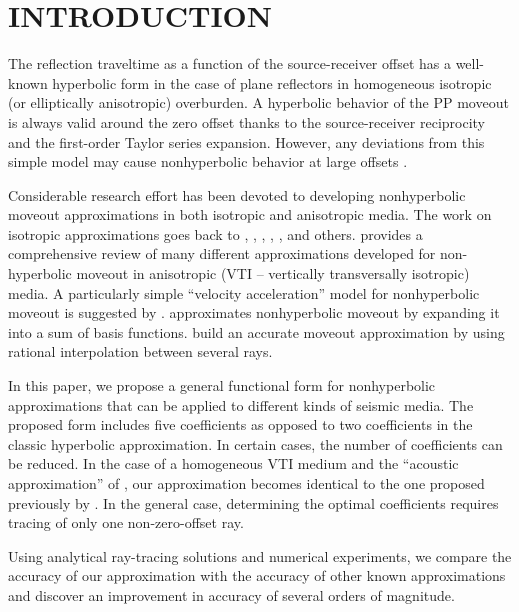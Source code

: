\section{INTRODUCTION}

The reflection traveltime as a function of the source-receiver offset
has a well-known hyperbolic form in the case of plane reflectors in
homogeneous isotropic (or elliptically anisotropic) overburden. A
hyperbolic behavior of the PP moveout is always valid around the zero
offset thanks to the source-receiver reciprocity and the first-order
Taylor series expansion. However, any deviations from this simple
model may cause nonhyperbolic behavior at large offsets
\cite[]{fandg}.

Considerable research effort has been devoted to developing
nonhyperbolic moveout approximations in both isotropic and anisotropic
media. The work on isotropic approximations goes back to
\cite{bolshykh}, \cite{GEO34-06-08590881}, \cite{malovichko},
\cite{GEO53-02-01430157}, \cite{GEO59-06-09830999}, and
others. \cite{fowler} provides a comprehensive review of many
different approximations developed for non-hyperbolic moveout in
anisotropic (VTI -- vertically transversally isotropic) media. A
particularly simple ``velocity acceleration'' model for nonhyperbolic
moveout is suggested by
\cite{taner1,taner2}. \cite{causse} approximates nonhyperbolic moveout
by expanding it into a sum of basis functions. \cite{douma}  build an accurate moveout approximation by using
rational interpolation between several rays.

In this paper, we propose a general functional form for nonhyperbolic
approximations that can be applied to different kinds of seismic
media. The proposed form includes five coefficients as opposed to two
coefficients in the classic hyperbolic approximation. In certain
cases, the number of coefficients can be reduced. In the case of a
homogeneous VTI medium and the ``acoustic approximation'' of
\cite{GEO63-02-06230631}, our approximation becomes identical to the
one proposed previously by \cite{GPR52-03-02470259}. In the general
case, determining the optimal coefficients requires tracing of only
one non-zero-offset ray.

Using analytical ray-tracing solutions and numerical experiments, we
compare the accuracy of our approximation with the accuracy of other
known approximations and discover an improvement in accuracy of
several orders of magnitude. 

